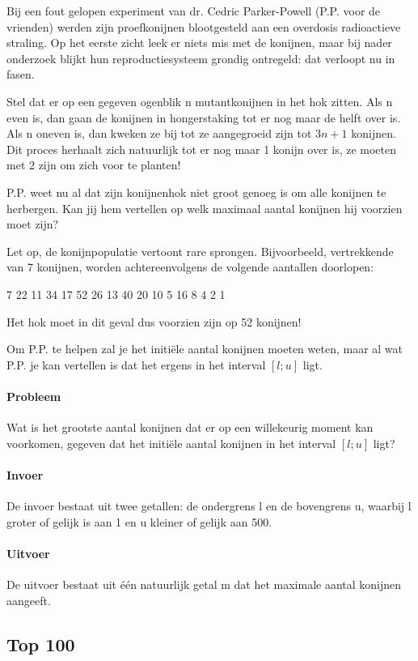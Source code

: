Bij een fout gelopen experiment van dr. Cedric Parker-Powell (P.P. voor de vrienden) werden zijn proefkonijnen blootgesteld aan een overdosis radioactieve straling. Op het eerste zicht leek er niets mis met de konijnen, maar bij nader onderzoek blijkt hun reproductiesysteem grondig ontregeld: dat verloopt nu in fasen.

Stel dat er op een gegeven ogenblik n mutantkonijnen in het hok zitten. Als n even is, dan gaan de konijnen in hongerstaking tot er nog maar de helft over is. Als n oneven is, dan kweken ze bij tot ze aangegroeid zijn tot $3n + 1$ konijnen. Dit proces herhaalt zich natuurlijk tot er nog maar 1 konijn over is, ze moeten met 2 zijn om zich voor te planten!

P.P. weet nu al dat zijn konijnenhok niet groot genoeg is om alle konijnen te herbergen. Kan jij hem vertellen op welk maximaal aantal konijnen hij voorzien moet zijn?

Let op, de konijnpopulatie vertoont rare sprongen. Bijvoorbeeld, vertrekkende van 7 konijnen, worden achtereenvolgens de volgende aantallen doorlopen:

7 22 11 34 17 52 26 13 40 20 10 5 16 8 4 2 1

Het hok moet in dit geval dus voorzien zijn op 52 konijnen!

Om P.P. te helpen zal je het initi\"ele aantal konijnen moeten weten, maar al wat P.P. je kan vertellen is dat het ergens in het interval $[l; u]$ ligt.

\paragraph{Probleem} Wat is het grootste aantal konijnen dat er op een willekeurig moment kan voorkomen, gegeven dat het initi\"ele aantal konijnen in het interval $[l; u]$ ligt?

\paragraph{Invoer} De invoer bestaat uit twee getallen: de ondergrens l en de bovengrens u, waarbij l groter of gelijk is aan 1 en u kleiner of gelijk aan 500.

\paragraph{Uitvoer} De uitvoer bestaat uit \'e\'en natuurlijk getal m dat het maximale aantal konijnen aangeeft.

\subsection{Top 100}

